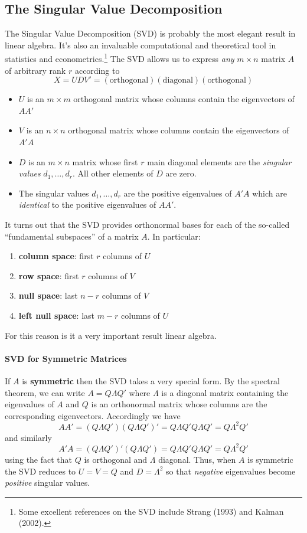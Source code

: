 \subsection{The Singular Value Decomposition}
The Singular Value Decomposition (SVD) is probably the most elegant result in linear algebra.
It's also an invaluable computational and theoretical tool in statistics and econometrics.\footnote{Some excellent references on the SVD include Strang (1993) and Kalman (2002).}
The SVD allows us to express \emph{any} $m \times n$ matrix $A$ of arbitrary rank $r$ according to 
	$$X = UDV' = (\mbox{orthogonal})(\mbox{diagonal})(\mbox{orthogonal})$$
	\begin{itemize}
	 	\item $U$ is an $m\times m$ orthogonal matrix whose columns contain the eigenvectors of $AA'$
	 	\item $V$ is an $n\times n$ orthogonal matrix whose columns contain the eigenvectors of $A'A$
	 	\item $D$ is an $m\times n$ matrix whose first $r$ main diagonal elements are the  \emph{singular values} $d_1, \hdots, d_r$. All other elements of $D$ are zero.
	 	\item The singular values $d_1, \hdots, d_r$ are the positive eigenvalues of $A'A$ which are \emph{identical} to the positive eigenvalues of $AA'$.
	 \end{itemize} 

It turns out that the SVD provides orthonormal bases for each of the so-called ``fundamental subspaces'' of a matrix $A$.
In particular:
	\begin{enumerate}
		\item \textbf{column space}: first $r$ columns of $U$
		\item \textbf{row space}: first $r$ columns of $V$
		\item \textbf{null space}: last $n - r$ columns of $V$
		\item \textbf{left null space}: last $m - r$ columns of $U$
	\end{enumerate}
For this reason is it a very important result linear algebra.


  \paragraph{SVD for Symmetric Matrices} If $A$ is \textbf{symmetric} then the SVD takes a very special form.
  By the spectral theorem, we can write $A = Q\Lambda Q'$ where $\Lambda$ is a diagonal matrix containing the eigenvalues of $A$ and $Q$ is an orthonormal matrix whose columns are the corresponding eigenvectors.
  Accordingly we have
  \[
    AA' = (Q\Lambda Q')(Q\Lambda Q')' = Q \Lambda Q' Q \Lambda Q' = Q \Lambda^2 Q'
  \]
  and similarly
  \[
    A'A = (Q\Lambda Q')'(Q\Lambda Q') = Q \Lambda Q' Q \Lambda Q' = Q \Lambda^2 Q'
  \]
  using the fact that $Q$ is orthogonal and $\Lambda$ diagonal.
  Thus, when $A$ is symmetric the SVD reduces to $U = V = Q$ and $D =  \Lambda^2$ so that \emph{negative} eigenvalues become \emph{positive} singular values.

